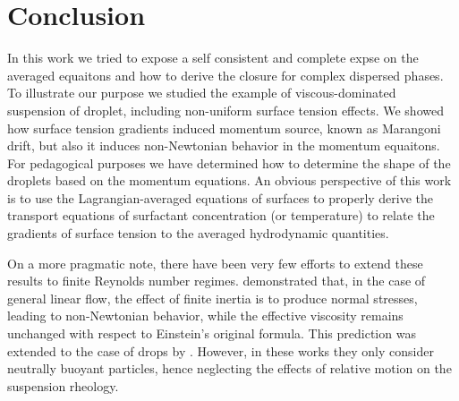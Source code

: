 \section{Conclusion}
\label{sec:conclusion}




In this work we tried to expose a self consistent and complete expse on the averaged equaitons and how to derive the closure for complex dispersed phases. 
To illustrate our purpose we studied the example of viscous-dominated suspension of droplet, including non-uniform surface tension effects. 
We showed how surface tension gradients induced momentum source, known as Marangoni drift, but also it induces non-Newtonian behavior in the momentum equaitons. 
For pedagogical purposes we have determined how to determine the shape of the droplets based on the momentum equations. 
An obvious perspective of this work is to use the Lagrangian-averaged equations of surfaces to properly derive the transport equations of surfactant concentration (or temperature) to relate the gradients of surface tension to the averaged hydrodynamic quantities.  


On a more pragmatic note, there have been very few efforts to extend these results to finite Reynolds number regimes. \citet{stone2001inertial} demonstrated that, in the case of general linear flow, the effect of finite inertia is to produce normal stresses, leading to non-Newtonian behavior, while the effective viscosity remains unchanged with respect to Einstein's original formula. 
This prediction was extended to the case of drops by \citet{raja2010inertial}. 
However, in these works they only consider neutrally buoyant particles, hence neglecting the effects of relative motion on the suspension rheology. 


